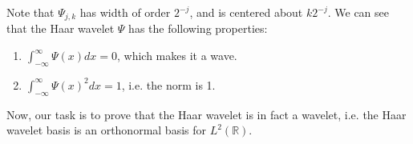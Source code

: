 \documentclass[2pt]{amsart}
\theoremstyle{theorem} %
\theoremstyle{definition}
\theoremstyle{example}
\theoremstyle{remark}
\numberwithin{equation}{section}
\newcommand{\R}{\mathbb{R}}
\begin{document}
Note that $ \varPsi_{j,k} $ has width of order $ 2^{-j} $, and is centered about $ k 2^{-j} $. We can see that the Haar wavelet $ \varPsi $ has the following properties:
\begin{enumerate}
	\item $ \int_{-\infty}^{\infty} \varPsi(x)dx = 0 $, which makes it a wave.
	\item  $ \int_{-\infty}^{\infty} \varPsi(x)^2dx = 1 $, i.e. the norm is 1.
\end{enumerate}

Now, our task is to prove that the Haar wavelet is in fact a wavelet, i.e. the Haar wavelet basis is an orthonormal basis for $ L^2(\R) $.

	
\end{document}
